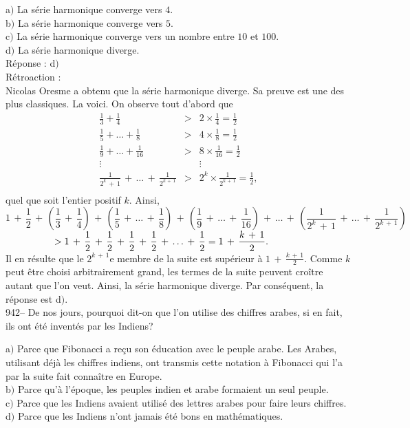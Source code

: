 ﻿\documentclass[letterpaper, 12pt]{article}
\begin{document}
a$)$ La s\'erie harmonique converge vers $4$. \\
b$)$ La s\'erie harmonique converge vers $5$. \\
c$)$ La s\'erie harmonique converge vers un nombre entre $10$ et $100$. \\
d$)$ La s\'erie harmonique diverge.\\

R\'eponse : d$)$\\

R\'etroaction :\\
Nicolas Oresme a obtenu que la s\'erie harmonique diverge. Sa preuve
est une des plus classiques. La voici. On observe tout d'abord que
$$\begin{array}{rcl}
\displaystyle{\frac13+\frac14}                      & > &
\displaystyle{2\times\frac14=\frac12} \\ [3mm]
\displaystyle{\frac15+\ldots+\frac18}               & > &
\displaystyle{4\times\frac18=\frac12} \\ [3mm]
\displaystyle{\frac19+\ldots+\frac1{16}}            & > &
\displaystyle{8\times\frac1{16}=\frac12} \\ [3mm] \vdots &   &
\vdots \\ [3 mm]
\displaystyle{\frac1{2^k\,+\,1}\,+\,\ldots\,+\,\frac1{2^{k\,+\,1}}}
& > & \displaystyle{2^k\times\frac1{2^{k\,+\,1}}=\frac12}, \\ [3mm]
\end{array}$$
quel que soit l'entier positif $k$. Ainsi,
$$\displaystyle{1\,+\,\frac12\,+\,\left(\frac13\,+\,\frac14\right)\,+\,\left(\frac15\,+\,\ldots\,+\,\frac18\right)\,+\,\left(\frac19\,+\,\ldots\,+\,\frac1{16}\right)\,+\,\ldots\,+\,
\left(\frac1{2^k\,+\,1}\,+\,\ldots\,+\,\frac1{2^{k\,+\,1}}\right)}$$
$\hskip 50 pt >
\displaystyle{1\,+\,\frac12\,+\,\frac12\,+\,\frac12\,+\,\frac12\,+\,\ldots\,+\,\frac12=1\,+\,\frac{k\,+\,1}2}.$\\[3mm]
Il en r\'esulte que le $2^{k\,+\,1}$e membre de la suite est
sup\'erieur \`a $1\,+\,\frac{k\,+\,1}2$. Comme $k$ peut \^etre
choisi arbitrairement grand,
les termes de la suite peuvent cro\^itre autant que l'on veut. Ainsi, la
s\'erie harmonique diverge. Par cons\'equent, la r\'eponse est d$)$.\\

942-- De nos jours, pourquoi dit-on que l'on utilise des chiffres
arabes, si en fait, ils ont \'et\'e invent\'es par les Indiens?

a$)$ Parce que Fibonacci a re\c cu son \'education avec le peuple
arabe. Les Arabes, utilisant d\'ej\`a les chiffres indiens, ont
transmis
cette notation \`a Fibonacci qui l'a par la suite fait conna\^itre en
Europe. \\
b$)$ Parce qu'\`a l'\'epoque, les peuples indien et arabe formaient un seul
peuple.  \\
c$)$ Parce que les Indiens avaient utilis\'e des lettres arabes pour faire
leurs chiffres. \\
d$)$ Parce que les Indiens n'ont jamais \'et\'e bons en math\'ematiques.\\
\end{document}
